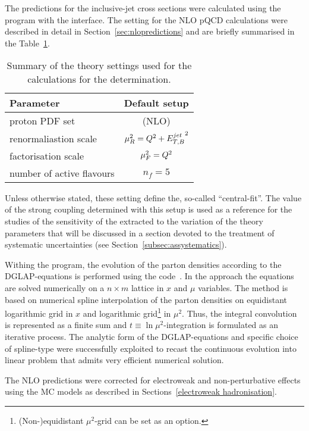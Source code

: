 The predictions for the inclusive-jet cross sections were calculated using the \nlojet program with the \fastnlo interface. The setting for the NLO pQCD calculations were described in detail in Section~\ref{sec:nlopredictions} and are briefly summarised in the Table~\ref{tab:nlosettings}.
\begin{table}[h]
\centering
\begin{tabular}{l|c}
Parameter  & Default setup \\ 
\hline \hline proton PDF set & \herapdf1.5 (NLO) \\
\hline renormaliastion scale & $\mu_R^2=\mbox{${Q^2}$} + \mbox{$E_{T,B}^{jet}$}^2$ \\ 
\hline factorisation scale          & $\mu_F^2=\mbox{${Q^2}$} $ \\ 
\hline number of active flavours    & $n_f = 5 $ \\ 
\end{tabular} 
\caption{Summary of the theory settings used for the calculations for the \as determination.}
\label{tab:nlosettings}
\end{table}
Unless otherwise stated, these setting define the, so-called ``central-fit''. The value of the strong coupling determined with this setup is used as a reference for the studies of the sensitivity of the extracted \asz to the variation of the theory parameters that will be discussed in a section devoted to the treatment of systematic uncertainties (see Section~\ref{subsec:assystematics}).

Withing the \herafitter program, the evolution of the parton densities according to the DGLAP-equations is performed using the \qcdnum code~\cite{Botje:2010ay}. In the \qcdnum approach the equations are solved numerically on a $n\times m$ lattice in $x$ and $\mu$ variables. The method is based on numerical spline interpolation of the parton densities on equidistant logarithmic grid in $x$ and logarithmic grid\footnote{(Non-)equidistant $\mu^2$-grid can be set as an option.} in $\mu^2$. Thus, the integral convolution is represented as a finite sum and $t \equiv \ln{\mu^2}$-integration is formulated as an iterative process. The analytic form of the DGLAP-equations and specific choice of spline-type were successfully exploited to recast the continuous evolution into linear problem that admits very efficient numerical solution.

The NLO predictions were corrected for electroweak and non-perturbative effects using the MC models as described in Sections~\ref{electroweak hadronisation}.
